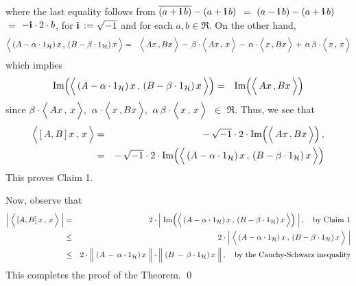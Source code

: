 where the last equality follows from
$\overline{(a + \textnormal{\bf i}\,b)} - (a + \textnormal{\bf i}\,b)$ $=$ $(a - \textnormal{\bf i}\,b) - (a + \textnormal{\bf i}\,b)$ $=$ $-\textnormal{\bf i}\cdot 2\cdot b$,
for $\textnormal{\bf i}\,:=\sqrt{-1}$ and for each $a,b\in\Re$.
On the other hand,
\begin{eqnarray*}
\left\langle\,
	(A -\alpha\cdot 1_{\H})\,\overset{{\color{white}1}}{x}
	\,,\,
	(B - \beta\cdot 1_{\H})\,x
	\,\right\rangle
&=&
	\left\langle\, A\overset{{\color{white}1}}{x} \,, Bx \,\right\rangle
	\,-\,
		\beta\cdot
		\left\langle\, A\overset{{\color{white}1}}{x} \,,\, x \,\right\rangle
	\,-\,
		\alpha\cdot
		\left\langle\, \overset{{\color{white}1}}{x} \,, Bx \,\right\rangle
	\,+\,
		\alpha\,\beta\cdot
		\left\langle\, \overset{{\color{white}1}}{x} \,,\, x \,\right\rangle
\end{eqnarray*}
which implies
\begin{eqnarray*}
\textnormal{Im}\!\left(
	\left\langle\,
		(A -\alpha\cdot 1_{\H})\,\overset{{\color{white}1}}{x}
		\,,\,
		(B - \beta\cdot 1_{\H})\,x
		\,\right\rangle
	\right)
&=&
	\textnormal{Im}\!\left(
		\left\langle\, A\overset{{\color{white}1}}{x} \,, Bx \,\right\rangle
		\right)
\end{eqnarray*}
since
$\beta\cdot\left\langle\, A\overset{{\color{white}1}}{x} \,,\, x \,\right\rangle$,\,
$\alpha\cdot\left\langle\, \overset{{\color{white}1}}{x} \,, Bx \,\right\rangle$,\,
$\alpha\,\beta\cdot\left\langle\, \overset{{\color{white}1}}{x} \,,\, x \,\right\rangle$\,
$\in$ $\Re$.
Thus, we see that
\begin{eqnarray*}
\left\langle\,[\,A,B\,]\,x\,,\,\overset{{\color{white}1}}{x}\,\right\rangle
&=&
	-\, \sqrt{-1} \cdot 2 \cdot
	\textnormal{Im}\!\left(\left\langle\,Ax\,,B\overset{{\color{white}1}}{x}\,\right\rangle\right),
\\
&=&
	-\, \sqrt{-1} \cdot 2 \cdot
	\textnormal{Im}\!\left(
		\left\langle\,
			(A -\alpha\cdot 1_{\H})\,\overset{{\color{white}1}}{x}
			\,,\,
			(B - \beta\cdot 1_{\H})\,x
			\,\right\rangle
		\right)
\end{eqnarray*}
This proves Claim 1.

\vskip 0.5cm
\noindent
Now, observe that
\begin{eqnarray*}
\left\vert\; \left\langle\,[A,B]\,x\,,\,\overset{{\color{white}1}}{x}\,\right\rangle \;\right\vert
& = &
	2 \cdot
	\left\vert\;
		\textnormal{Im}\!\left(
			\left\langle\,
				(A -\alpha\cdot 1_{\H})\,\overset{{\color{white}1}}{x}
				\,,\,
				(B - \beta\cdot 1_{\H})\,x
				\,\right\rangle
			\right)
		\;\right\vert,
	\quad
	\textnormal{by Claim 1}
\\
& \leq &
	2 \cdot
	\left\vert\;
			\left\langle\,
				(A -\alpha\cdot 1_{\H})\,\overset{{\color{white}1}}{x}
				\,,\,
				(B - \beta\cdot 1_{\H})\,x
				\,\right\rangle
		\;\right\vert
\\
& \leq &
	2 \cdot
	\left\Vert\; (A \,-\, \alpha\cdot 1_{\H})\,\overset{{\color{white}1}}{x} \;\right\Vert
	\cdot
	\left\Vert\; (B \,-\, \beta\cdot 1_{\H})\,\overset{{\color{white}1}}{x} \;\right\Vert,
	\quad
	\textnormal{by the Cauchy-Schwarz inequality}
\end{eqnarray*}
This completes the proof of the Theorem.
\qed

